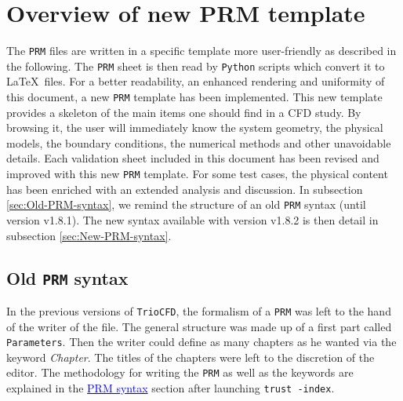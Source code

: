 \chapter{\label{chap:New-PRM-syntax}Overview of new \textsf{PRM} template}
The \texttt{PRM} files are written in a specific template 
more user-friendly as described in the following.
The \texttt{PRM} sheet is then read by \texttt{Python} scripts which
convert it to \LaTeX~files.\smallskip\newline
For a better readability, an enhanced rendering and uniformity of
this document, a new \texttt{PRM} template has been implemented. This
new template provides a skeleton of the main items one should find in a CFD
study. By browsing it, the user will immediately know the system geometry,
the physical models, the boundary conditions, the numerical methods
and other unavoidable details. Each validation sheet included in this document
has been revised and improved with this new \texttt{PRM} template.
For some test cases, the physical content has been enriched with an extended
analysis and discussion. In subsection \ref{sec:Old-PRM-syntax},
we remind the structure of an old \texttt{PRM} syntax
(until version \textsf{v1.8.1}). The new syntax available with version \textsf{v1.8.2}
is then detail in subsection \ref{sec:New-PRM-syntax}.

\section{\label{sec:Old-PRM-syntax}Old \texttt{PRM} syntax}
In the previous versions of \texttt{TrioCFD}, the formalism of a \texttt{PRM} was left to the hand of the writer of the file. 
The general structure was made up of a first part called \texttt{Parameters}. Then the writer could define as many chapters as he wanted via the keyword \textit{Chapter}.
The titles of the chapters were left to the discretion of the editor.
The methodology for writing the \texttt{PRM} as well as the keywords are explained in the \textcolor{blue}{\underline{PRM syntax}} section after launching \verb "trust -index".\newline \newline

